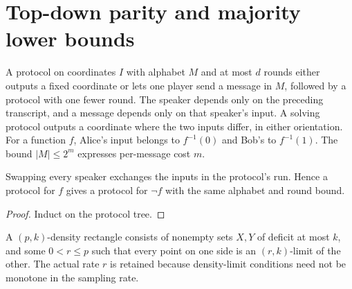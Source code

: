 \section{Top-down parity and majority lower bounds}
\label{sec:lowerbounds-topdown-parity}

\begin{definition}
  \label{def:lowerbounds-round-protocol}
  \leanok
  A protocol on coordinates $I$ with alphabet $M$ and at most $d$ rounds
  either outputs a fixed coordinate or lets one player send a message in
  $M$, followed by a protocol with one fewer round. The speaker depends
  only on the preceding transcript, and a message depends only on that
  speaker's input. A solving protocol outputs a coordinate where the two
  inputs differ, in either orientation. For a function $f$, Alice's input
  belongs to $f^{-1}(0)$ and Bob's to $f^{-1}(1)$.
  The bound $|M|\le2^m$ expresses per-message cost $m$.
\end{definition}

\begin{lemma}
  \label{lem:lowerbounds-round-swap}
  \leanok
  Swapping every speaker exchanges the inputs in the protocol's run.
  Hence a protocol for $f$ gives a protocol for $\neg f$ with the same
  alphabet and round bound.
\end{lemma}
\begin{proof}
  \leanok
  Induct on the protocol tree.
\end{proof}

\begin{definition}
  \label{def:lowerbounds-density-rectangle}
  \leanok
  A $(p,k)$-density rectangle consists of nonempty sets $X,Y$ of deficit
  at most $k$, and some $0<r\le p$ such that every point on one side is an
  $(r,k)$-limit of the other. The actual rate $r$ is retained because
  density-limit conditions need not be monotone in the sampling rate.
\end{definition}

